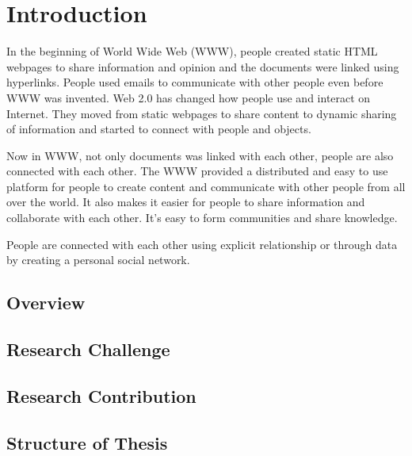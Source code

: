 

\chapter{Introduction} \label{Chapter:Introduction}

In the beginning of World Wide Web (WWW), people created static HTML webpages to share information and opinion and the documents were linked using hyperlinks. People used emails to communicate with other people even before WWW was invented. Web 2.0 has changed how people use and interact on Internet. They moved from static webpages to share content to dynamic sharing of information and started to connect with people and objects.

Now in WWW, not only documents was linked with each other, people are also connected with each other. The WWW provided a distributed and easy to use platform for people to create content and communicate with other people from all over the world. It also makes it easier for people to share information and collaborate with each other. It's easy to form communities and share knowledge.

People are connected with each other using explicit relationship or through data by creating a personal social network.




\section{Overview}
\section{Research Challenge}
\section{Research Contribution}
\section{Structure of Thesis}
